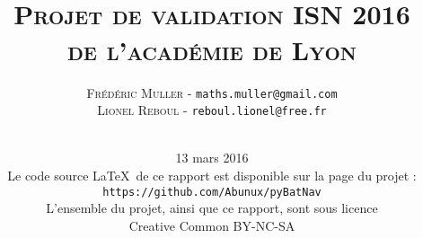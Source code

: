 


\lfoot[\thepage]{}
\rfoot[]{\thepage}
\usepackage{moreverb}

\renewcommand{\thepart}{}




\title{\\ \medskip \medskip\medskip\medskip \large{\textsc{Projet de validation ISN 2016\\de l'académie de Lyon}}}
\author{\textsc{Frédéric Muller} - \texttt{maths.muller@gmail.com}\\ \textsc{Lionel Reboul} - \texttt{reboul.lionel@free.fr}\\ \\ \medskip \medskip
   }
\date{\vfill
13 mars 2016\\
\medskip \medskip \medskip 
Le code source \LaTeX\ de ce rapport est disponible sur la page du projet :\\
\texttt{https://github.com/Abunux/pyBatNav}\\ \medskip
L'ensemble du projet, ainsi que ce rapport, sont sous licence\\Creative Common BY-NC-SA}

\maketitle


\clearpage{\pagestyle{empty}\cleardoublepage}
\setcounter{tocdepth}{1}
\tableofcontents
\thispagestyle{fancy}









